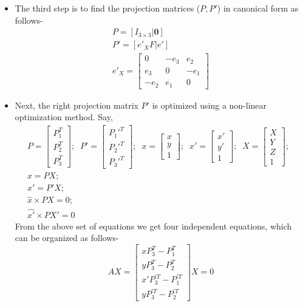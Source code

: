 \documentclass{article}
\begin{document}
\begin{itemize}
\item The third step is to find the projection matrices ($P,P'$) in canonical form as follows-
\begin{eqnarray}
	P = [I_{3\times 3}|\textbf{0}] \\
	P' = [e'_{X}F|e']\\
	e'_{X} = \begin{bmatrix}
	0 & -e_3 & e_2 \\ e_3 & 0 & -e_1 \\ -e_2 & e_1 & 0
	\end{bmatrix}
\end{eqnarray}
\item Next, the right projection matrix $P'$ is optimized using a non-linear optimization method. Say,
\begin{eqnarray}
	P = \begin{bmatrix}
		P_1^T \\ P_2^T \\ P_3^T
	\end{bmatrix};\;\;
	P' = \begin{bmatrix}
		P_1'^T \\ P_2'^T \\ P_3'^T
	\end{bmatrix};\;\;
	x = \begin{bmatrix}
	x \\ y \\ 1
	\end{bmatrix};\;\;
	x' = \begin{bmatrix}
	x' \\ y' \\ 1
	\end{bmatrix};\;\;
	X = \begin{bmatrix}
	X \\ Y \\ Z \\ 1
	\end{bmatrix};\;\;\\
	x = PX;\;\;\\
	x' = P'X;\;\;\\
	\hat{x} \times PX = 0;\;\;\\
	\hat{x'} \times PX' = 0
\end{eqnarray}
From the above set of equations we get  four independent equations, which can be organized as follows-
\begin{equation}
AX = \begin{bmatrix}
xP_3^T - P_1^T \\ yP_3^T - P_2^T \\ x'P_3^{'T} - P_1^{'T} \\ yP_3^{'T} - P_2^{'T}
\end{bmatrix}X = 0
\end{equation}


\end{itemize}
\end{document}
